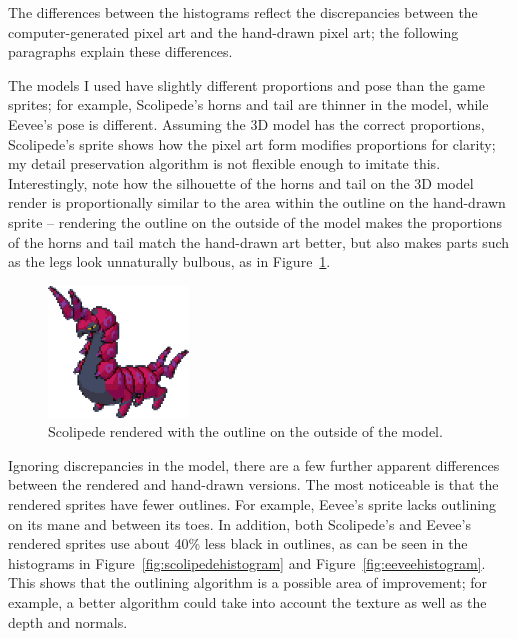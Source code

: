 \documentclass[12pt,twoside,notitlepage]{report}
\begin{document}
The differences between the histograms reflect the discrepancies between the computer-generated pixel art and the hand-drawn pixel art; the following paragraphs explain these differences.

The models I used have slightly different proportions and pose than the game sprites; for example, Scolipede's horns and tail are thinner in the model, while Eevee's pose is different. Assuming the 3D model has the correct proportions, Scolipede's sprite shows how the pixel art form modifies proportions for clarity; my detail preservation algorithm is not flexible enough to imitate this. Interestingly, note how the silhouette of the horns and tail on the 3D model render is proportionally similar to the area within the outline on the hand-drawn sprite -- rendering the outline on the outside of the model makes the proportions of the horns and tail match the hand-drawn art better, but also makes parts such as the legs look unnaturally bulbous, as in Figure~\ref{fig:bulbous}.

\begin{figure}[h!]
\centering
\includegraphics[width=0.333\textwidth]{bulbous}
\caption{Scolipede rendered with the outline on the outside of the model.}
\label{fig:bulbous}
\end{figure}

Ignoring discrepancies in the model, there are a few further apparent differences between the rendered and hand-drawn versions. The most noticeable is that the rendered sprites have fewer outlines. For example, Eevee's sprite lacks outlining on its mane and between its toes. In addition, both Scolipede's and Eevee's rendered sprites use about 40\% less black in outlines, as can be seen in the histograms in Figure~\ref{fig:scolipedehistogram} and Figure~\ref{fig:eeveehistogram}. This shows that the outlining algorithm is a possible area of improvement; for example, a better algorithm could take into account the texture as well as the depth and normals.
\end{document}
